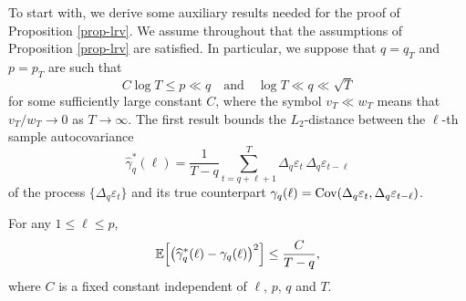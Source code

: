 To start with, we derive some auxiliary results needed for the proof of Proposition \ref{prop-lrv}. We assume throughout that the assumptions of Proposition \ref{prop-lrv} are satisfied. In particular, we suppose that $q = q_T$ and $p=p_T$ are such that 
\[ C \log T \le p \ll q \quad \text{and} \quad \log T \ll q \ll \sqrt{T} \]
for some sufficiently large constant $C$, where the symbol $v_T \ll w_T$ means that $v_T/w_T \rightarrow 0$ as $T \rightarrow \infty$. The first result bounds the $L_2$-distance between the $\ell$-th sample autocovariance
\[ \widehat{\gamma}_q^*(\ell) =  \frac{1}{T-q} \sum\limits_{t=q+\ell+1}^T \Delta_q \varepsilon_t \, \Delta_q \varepsilon_{t-\ell} \]
of the process $\{\Delta_q \varepsilon_t \}$ and its true counterpart $\gamma_q(\ell) = \textnormal{Cov}(\Delta_q \varepsilon_t,\Delta_q \varepsilon_{t-\ell})$. 
\begin{lemmaA}\label{lemma-lrv-1}
For any $1 \le \ell \le p$,   
\[ \mathbb{E} \Big[ \big( \widehat{\gamma}_q^*(\ell) - \gamma_q(\ell) \big)^2 \Big] \le \frac{C}{T-q}, \]
where $C$ is a fixed constant independent of $\ell$, $p$, $q$ and $T$. 
\end{lemmaA}


